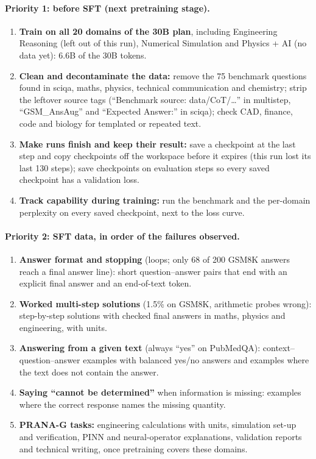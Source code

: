 \documentclass[11pt,a4paper]{article}
\begin{document}
\paragraph{Priority 1: before SFT (next pretraining stage).}
\begin{enumerate}
\item \textbf{Train on all 20 domains of the 30B plan}, including Engineering Reasoning (left out of this run), Numerical Simulation and Physics + AI
  (no data yet): 6.6B of the 30B tokens.
\item \textbf{Clean and decontaminate the data:} remove the 75 benchmark questions found in sciqa, maths, physics, technical communication and
  chemistry; strip the leftover source tags (``Benchmark source: data/CoT/\dots'' in multistep, ``GSM\_AnsAug'' and ``Expected Answer:'' in sciqa);
  check CAD, finance, code and biology for templated or repeated text.
\item \textbf{Make runs finish and keep their result:} save a checkpoint at the last step and copy checkpoints off the workspace before it expires
  (this run lost its last 130 steps); save checkpoints on evaluation steps so every saved checkpoint has a validation loss.
\item \textbf{Track capability during training:} run the benchmark and the per-domain perplexity on every saved checkpoint, next to the loss curve.
\end{enumerate}

\paragraph{Priority 2: SFT data, in order of the failures observed.}
\begin{enumerate}
\item \textbf{Answer format and stopping} (loops; only 68 of 200 GSM8K answers reach a final answer line): short question--answer pairs that end with
  an explicit final answer and an end-of-text token.
\item \textbf{Worked multi-step solutions} (1.5\% on GSM8K, arithmetic probes wrong): step-by-step solutions with checked final answers in maths,
  physics and engineering, with units.
\item \textbf{Answering from a given text} (always ``yes'' on PubMedQA): context--question--answer examples with balanced yes/no answers and examples
  where the text does not contain the answer.
\item \textbf{Saying ``cannot be determined''} when information is missing: examples where the correct response names the missing quantity.
\item \textbf{PRANA-G tasks:} engineering calculations with units, simulation set-up and verification, PINN and neural-operator explanations,
  validation reports and technical writing, once pretraining covers these domains.
\end{enumerate}
\end{document}
